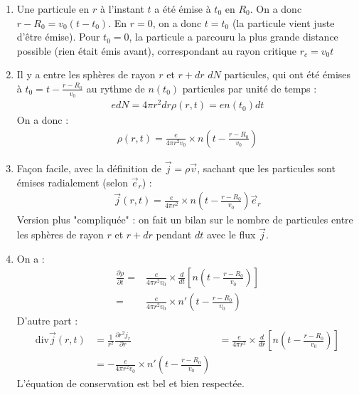 \newpage

\begin{correction}

\begin{enumerate}

	\item Une particule en $r$ à l'instant $t$ a été émise à $t_0$ en $R_0$. On a donc $r-R_0=v_0(t-t_0)$. En $r=0$, on a donc $t=t_0$ (la particule vient juste d'être émise). Pour $t_0=0$, la particule a parcouru la plus grande distance possible (rien était émis avant), correspondant au rayon critique $r_c=v_0t$
	
	\item Il y a entre les sphères de rayon $r$ et $r+dr$ $dN$ particules, qui ont été émises à $t_0=t-\frac{r-R_0}{v_0}$ au rythme de $n(t_0)$ particules par unité de temps :
	\begin{align*}
		edN=4\pi r^2dr\rho(r,t)=en(t_0)dt
	\end{align*}
	On a donc :
	\begin{align*}
		\rho(r,t)=\frac{e}{4\pi r^2 v_0}\times n\left(t-\frac{r-R_0}{v_0} \right) 
	\end{align*}
	
	\item Façon facile, avec la définition de $\vec{j}=\rho \vec{v}$, sachant que les particules sont émises radialement (selon $\vec{e}_r$) :
	\begin{align*}
		\vec{j}(r,t)=\frac{e}{4\pi r^2}\times n\left(t-\frac{r-R_0}{v_0} \right) \vec{e}_r
	\end{align*}
	Version plus "compliquée" : on fait un bilan sur le nombre de particules entre les sphères de rayon $r$ et $r+dr$ pendant $dt$ avec le flux $\vec{j}$.
	
	\item On a :
	\begin{align*}
		\frac{\partial \rho}{\partial t}=&\frac{e}{4\pi r^2 v_0}\times \frac{d}{dt} \left[ n\left(t-\frac{r-R_0}{v_0} \right) \right] \\
		=&\frac{e}{4\pi r^2 v_0}\times n'\left(t-\frac{r-R_0}{v_0} \right)
	\end{align*}
	D'autre part : 
	\begin{align*}
		\mathrm{div}\vec{j}(r,t)&=\frac{1}{r^2}\frac{\partial r^2j_r}{\partial r}
		&=\frac{e}{4\pi r^2}\times\frac{d}{dr} \left[ n\left(t-\frac{r-R_0}{v_0} \right) \right] \\
		&=-\frac{e}{4\pi r^2 v_0}\times n'\left(t-\frac{r-R_0}{v_0} \right)
	\end{align*}
	L'équation de conservation est bel et bien respectée.
	

\end{enumerate}
\end{correction}
